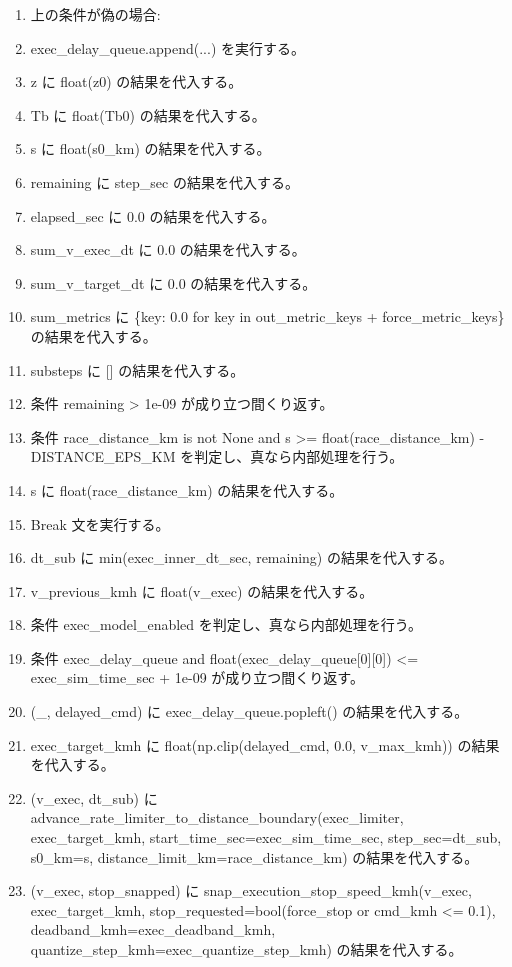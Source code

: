 \documentclass[a4paper,11pt]{article}
\begin{document}
\begin{enumerate}[leftmargin=1.8em]
\item     上の条件が偽の場合:
\item     exec\_delay\_queue.append(...) を実行する。
\item z に float(z0) の結果を代入する。
\item Tb に float(Tb0) の結果を代入する。
\item s に float(s0\_km) の結果を代入する。
\item remaining に step\_sec の結果を代入する。
\item elapsed\_sec に 0.0 の結果を代入する。
\item sum\_v\_exec\_dt に 0.0 の結果を代入する。
\item sum\_v\_target\_dt に 0.0 の結果を代入する。
\item sum\_metrics に \{key: 0.0 for key in out\_metric\_keys + force\_metric\_keys\} の結果を代入する。
\item substeps に [] の結果を代入する。
\item 条件 remaining > 1e-09 が成り立つ間くり返す。
\item   条件 race\_distance\_km is not None and s >= float(race\_distance\_km) - DISTANCE\_EPS\_KM を判定し、真なら内部処理を行う。
\item     s に float(race\_distance\_km) の結果を代入する。
\item     Break 文を実行する。
\item   dt\_sub に min(exec\_inner\_dt\_sec, remaining) の結果を代入する。
\item   v\_previous\_kmh に float(v\_exec) の結果を代入する。
\item   条件 exec\_model\_enabled を判定し、真なら内部処理を行う。
\item     条件 exec\_delay\_queue and float(exec\_delay\_queue[0][0]) <= exec\_sim\_time\_sec + 1e-09 が成り立つ間くり返す。
\item       (\_, delayed\_cmd) に exec\_delay\_queue.popleft() の結果を代入する。
\item       exec\_target\_kmh に float(np.clip(delayed\_cmd, 0.0, v\_max\_kmh)) の結果を代入する。
\item     (v\_exec, dt\_sub) に advance\_rate\_limiter\_to\_distance\_boundary(exec\_limiter, exec\_target\_kmh, start\_time\_sec=exec\_sim\_time\_sec, step\_sec=dt\_sub, s0\_km=s, distance\_limit\_km=race\_distance\_km) の結果を代入する。
\item     (v\_exec, stop\_snapped) に snap\_execution\_stop\_speed\_kmh(v\_exec, exec\_target\_kmh, stop\_requested=bool(force\_stop or cmd\_kmh <= 0.1), deadband\_kmh=exec\_deadband\_kmh, quantize\_step\_kmh=exec\_quantize\_step\_kmh) の結果を代入する。

\end{enumerate}
\end{document}
